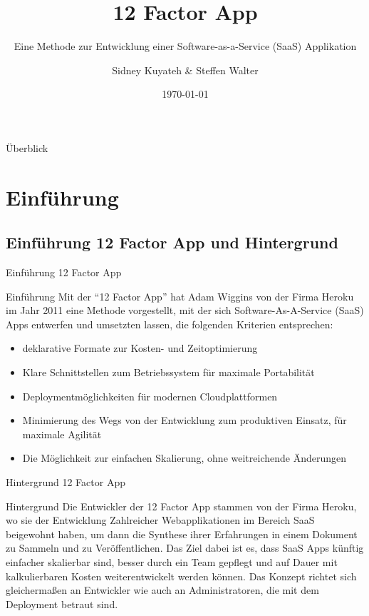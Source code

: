 \documentclass{beamer}
\title{12 Factor App}
\subtitle{Eine Methode zur Entwicklung einer Software-as-a-Service (SaaS) Applikation}
\author{Sidney Kuyateh \& Steffen Walter}
\institute{Duale Hochschule Baden-Württemberg}
\date{\today}
\begin{document}
	\maketitle
	\begin{frame}{Überblick}
		\scriptsize
		\setlength{\baselineskip}{7pt}
		\vspace{0.3cm}
		\tableofcontents
		\vfill
	\end{frame}
		\section{Einführung}
			\subsection{Einführung 12 Factor App und Hintergrund}
				\begin{frame}{Einführung 12 Factor App}
					\begin{block}{Einführung}
						Mit der \enquote{12 Factor App} hat Adam Wiggins von der Firma Heroku im Jahr 2011 eine Methode vorgestellt, mit der sich Software-As-A-Service (SaaS) Apps entwerfen und umsetzten lassen, die folgenden Kriterien entsprechen:
						\begin{itemize}
							\item deklarative Formate zur Kosten- und Zeitoptimierung
							\item Klare Schnittstellen zum Betriebssystem für maximale Portabilität
							\item Deploymentmöglichkeiten für modernen Cloudplattformen
							\item Minimierung des Wegs von der Entwicklung zum produktiven Einsatz, für maximale Agilität
							\item Die Möglichkeit zur einfachen Skalierung, ohne weitreichende Änderungen
						\end{itemize}
					\end{block}
				\end{frame}
				\begin{frame}{Hintergrund 12 Factor App}
					\begin{block}{Hintergrund}
						Die Entwickler der 12 Factor App stammen von der Firma Heroku, wo sie der Entwicklung Zahlreicher Webapplikationen im Bereich SaaS beigewohnt haben, um dann die Synthese ihrer Erfahrungen in einem Dokument zu Sammeln und zu Veröffentlichen.\newline
						Das Ziel dabei ist es, dass SaaS Apps künftig einfacher skalierbar sind, besser durch ein Team gepflegt und auf Dauer mit kalkulierbaren Kosten weiterentwickelt werden können. Das Konzept richtet sich gleichermaßen an Entwickler wie auch an Administratoren, die mit dem Deployment betraut sind.
					\end{block}
				\end{frame}
\end{document}
